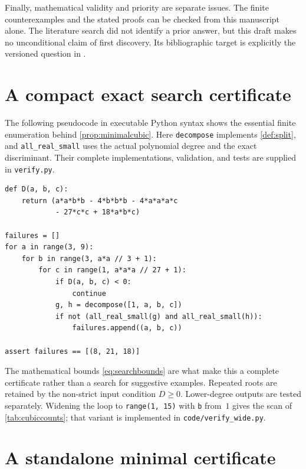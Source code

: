 \documentclass[11pt,letterpaper]{article}
\numberwithin{equation}{section}
\theoremstyle{definition}
\theoremstyle{remark}
\begin{document}
Finally, mathematical validity and priority are separate issues. The
finite counterexamples and the stated proofs can be checked from this
manuscript alone. The literature search did not identify a prior answer,
but this draft makes no unconditional claim of first discovery. Its
bibliographic target is explicitly the versioned question in \cite{MW}.

\appendix
\section{A compact exact search certificate}\label{app:code}

The following pseudocode in executable Python syntax shows the essential
finite enumeration behind \cref{prop:minimalcubic}. Here \texttt{decompose}
implements \cref{def:split}, and \texttt{all\_real\_small} uses the actual
polynomial degree and the exact discriminant. Their complete implementations,
validation, and tests are supplied in \texttt{verify.py}.
\begin{lstlisting}
def D(a, b, c):
    return (a*a*b*b - 4*b*b*b - 4*a*a*a*c
            - 27*c*c + 18*a*b*c)

failures = []
for a in range(3, 9):
    for b in range(3, a*a // 3 + 1):
        for c in range(1, a*a*a // 27 + 1):
            if D(a, b, c) < 0:
                continue
            g, h = decompose([1, a, b, c])
            if not (all_real_small(g) and all_real_small(h)):
                failures.append((a, b, c))

assert failures == [(8, 21, 18)]
\end{lstlisting}
The mathematical bounds \eqref{eq:searchbounds} are what make this a
complete certificate rather than a search for suggestive examples.
Repeated roots are retained by the non-strict input condition $D\ge0$.
Lower-degree outputs are tested separately. Widening the loop to
\texttt{range(1, 15)} with \texttt{b} from~$1$ gives the scan of
\cref{tab:cubiccounts}; that variant is implemented in
\texttt{code/verify\_wide.py}.

\section{A standalone minimal certificate}\label{app:certificate}
\end{document}

